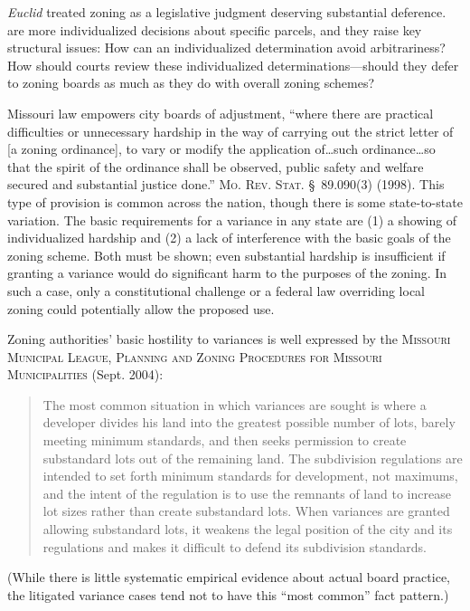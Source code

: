 \textit{Euclid} treated zoning as a legislative judgment deserving substantial
deference.  are more individualized decisions about
specific parcels,
and they raise key structural issues: How can an individualized determination
avoid arbitrariness? How should courts review these individualized
determinations---should they defer to zoning boards as much as they do with
overall zoning schemes?

Missouri law empowers city boards of adjustment, ``where there are practical
difficulties or unnecessary hardship in the way of carrying out the strict
letter of [a zoning ordinance], to vary or modify the application of\ldots such
ordinance\ldots so that the spirit of the ordinance shall be observed, public
safety and welfare secured and substantial justice done.'' \textsc{Mo. Rev.
Stat.} \S~89.090(3) (1998). This type of provision is common across the nation,
though there is some state-to-state variation. The basic requirements for a
variance in any state are (1) a showing of individualized hardship and (2) a
lack of interference with the basic goals of the zoning scheme. Both must be
shown; even substantial hardship is insufficient if granting a variance would do
significant harm to the purposes of the zoning. In such a case, only a
constitutional challenge or a federal law overriding local zoning could
potentially allow the proposed use.

Zoning authorities' basic hostility to variances is well expressed by the
\textsc{Missouri Municipal League, Planning and Zoning Procedures for Missouri
Municipalities} (Sept. 2004): 
\begin{quote}
The most common situation in which variances are sought is where a developer
divides his land into the greatest possible number of lots, barely meeting
minimum standards, and then seeks permission to create substandard lots out of
the remaining land. The subdivision regulations are intended to set forth
minimum standards for development, not maximums, and the intent of the
regulation is to use the remnants of land to increase lot sizes rather than
create substandard lots. When variances are granted allowing substandard lots,
it weakens the legal position of the city and its regulations and makes it
difficult to defend its subdivision standards.
\end{quote}

(While there is little systematic empirical evidence about actual board
practice, the litigated variance cases tend not to have this ``most common''
fact pattern.)

